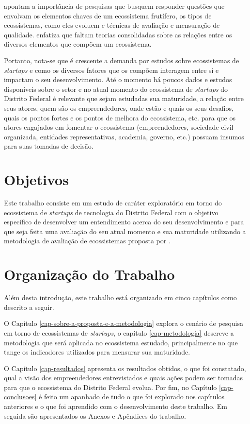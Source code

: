  apontam a importância de pesquisas que busquem responder questões que envolvam os elementos chaves de um ecossistema frutífero, os tipos de ecossistemas, como eles evoluem e técnicas de avaliação e mensuração de qualidade.  enfatiza que faltam teorias consolidadas sobre as relações entre os diversos elementos que compõem um ecossistema.

Portanto, nota-se que é crescente a demanda por estudos sobre ecossistemas de \textit{startups} e como os diversos fatores que os compõem interagem entre si e impactam o seu desenvolvimento. Até o momento há poucos dados e estudos disponíveis sobre o setor e no atual momento do ecossistema de \textit{startups} do Distrito Federal é relevante que sejam estudadas sua maturidade, a relação entre seus atores, quem são os empreendedores, onde estão e quais os seus desafios, quais os pontos fortes e os pontos de melhora do ecossistema, etc. para que os atores engajados em fomentar o ecossistema (empreendedores, sociedade civil organizada, entidades representativas, academia, governo, etc.) possuam insumos para suas tomadas de decisão. 

\section{Objetivos}
\label{section:objetivo_geral}

Este trabalho consiste em um estudo de caráter exploratório em torno do ecossistema de \textit{startups} de tecnologia do Distrito Federal com o objetivo específico de desenvolver um entendimento acerca do seu desenvolvimento e para que seja feita uma avaliação do seu atual momento e sua maturidade utilizando a metodologia de avaliação de ecossistemas proposta por . 

\section{Organização do Trabalho}
\label{section:organizacao_do_trabalho}

Além desta introdução, este trabalho está organizado em cinco capítulos como descrito a seguir.

O Capítulo \ref{cap-sobre-a-proposta-e-a-metodologia} explora o cenário de pesquisa em torno de ecossistemas de \textit{startups}, o capítulo \ref{cap-metodologia} descreve a metodologia que será aplicada no ecossistema estudado, principalmente no que tange os indicadores utilizados para mensurar sua maturidade.

O Capítulo \ref{cap-resultados} apresenta os resultados obtidos, o que foi constatado, qual a visão dos empreendedores entrevistados e quais ações podem ser tomadas para que o ecossistema do Distrito Federal evolua. Por fim, no Capítulo \ref{cap-conclusoes} é feito um apanhado de tudo o que foi explorado nos capítulos anteriores e o que foi aprendido com o desenvolvimento deste trabalho. Em seguida são apresentados os Anexos e Apêndices do trabalho.
